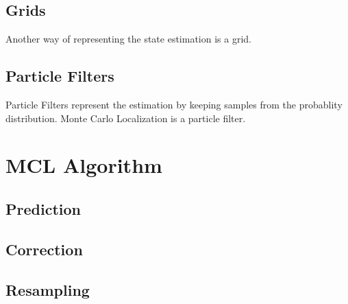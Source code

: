 \subsection{Grids}
Another way of representing the state estimation is a grid.

\subsection{Particle Filters}
Particle Filters represent the estimation by keeping samples from the
probablity distribution.
Monte Carlo Localization is a particle filter.

\section{MCL Algorithm}

\subsection{Prediction}
\subsection{Correction}
\subsection{Resampling}
